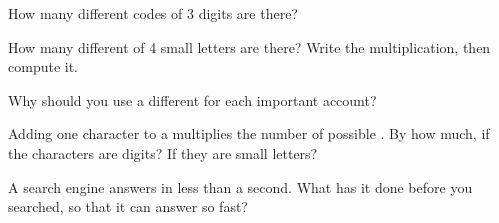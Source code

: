 \begin{exercise}[$\star$]\label{exo:g5:networks-first-look:7}
How many different codes of 3 digits are there?
\end{exercise}

\begin{exercise}[$\star$]\label{exo:g5:networks-first-look:8}
How many different  of 4 small letters are there? Write the
multiplication, then compute it.
\end{exercise}

\begin{exercise}[$\star\star$]\label{exo:g5:networks-first-look:9}
Why should you use a different  for each important account?
\end{exercise}

\begin{exercise}[$\star\star$]\label{exo:g5:networks-first-look:10}
Adding one character to a  multiplies the number of possible
. By how much, if the characters are digits? If they are small
letters?
\end{exercise}

\begin{exercise}[$\star\star$]\label{exo:g5:networks-first-look:11}
A search engine answers in less than a second. What has it done before you
searched, so that it can answer so fast?
\end{exercise}
